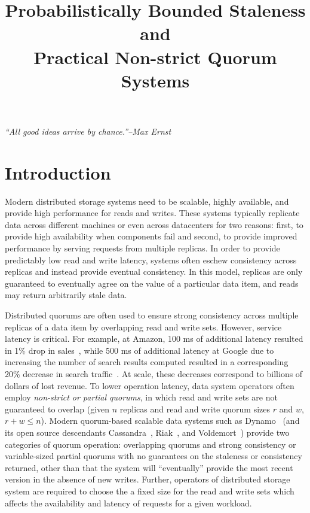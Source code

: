 \documentclass{vldb}
\title{Probabilistically Bounded Staleness and\\ Practical Non-strict Quorum Systems}
\begin{document}

\maketitle

\noindent\textit{``All good ideas arrive by chance.''--Max Ernst}



\section{Introduction}

Modern distributed storage systems need to be scalable, highly
available, and provide high performance for reads and writes.  These
systems typically replicate data across different machines or even
across datacenters for two reasons: first, to provide high
availability when components fail and second, to provide improved
performance by serving requests from multiple replicas.  In order to
provide predictably low read and write latency, systems often eschew
consistency across replicas and instead provide eventual
consistency. In this model, replicas are only guaranteed to eventually
agree on the value of a particular data item, and reads may return
arbitrarily stale data.

Distributed quorums are often used to ensure strong consistency across
multiple replicas of a data item by overlapping read and write
sets. However, service latency is critical. For example, at Amazon,
100 ms of additional latency resulted in 1\% drop in
sales~\cite{amazon-latency}, while 500 ms of additional latency at
Google due to increasing the number of search results computed
resulted in a corresponding 20\% decrease in search
traffic~\cite{google-talk}.  At scale, these decreases correspond to
billions of dollars of lost revenue.  To lower operation latency, data
system operators often employ \textit{non-strict or partial quorums},
in which read and write sets are not guaranteed to overlap (given $n$
replicas and read and write quorum sizes $r$ and $w$, $r+w \leq n$).
Modern quorum-based scalable data systems such as Dynamo~\cite{dynamo}
(and its open source descendants Cassandra~\cite{cassandra},
Riak~\cite{riak}, and Voldemort~\cite{voldemort}) provide two
categories of quorum operation: overlapping quorums and strong
consistency or variable-sized partial quorums with no guarantees on
the staleness or consistency returned, other than that the system will
``eventually'' provide the most recent version in the absence of new
writes. Further, operators of distributed storage system are required
to choose the a fixed size for the read and write sets which affects
the availability and latency of requests for a given workload.
\end{document}
